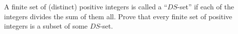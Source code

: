 A finite set of (distinct) positive integers is called a ``$DS$-set'' if each of the integers divides the sum of them all. Prove that every finite set of positive integers is a subset of some $DS$-set.

